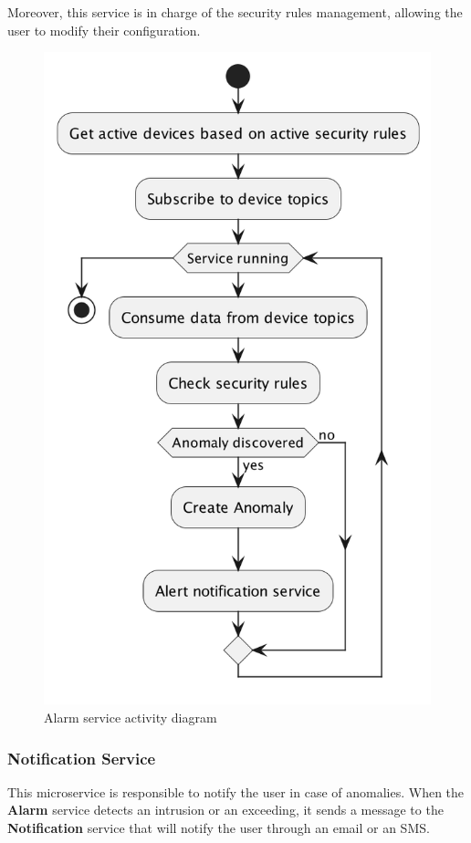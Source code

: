 \documentclass{scrartcl}
\begin{document}
    Moreover, this service is in charge of the security rules management, allowing the user to modify their configuration.

    \begin{figure}
        \centering
        \includegraphics[scale=0.24]{img/alarm-activity}
        \caption{Alarm service activity diagram}
        \label{fig:alarm-activity}
    \end{figure}

    \subsubsection{Notification Service}
    This microservice is responsible to notify the user in case of anomalies.
    When the \textbf{Alarm} service detects an intrusion or an exceeding, it sends a message to the \textbf{Notification}
    service that will notify the user through an email or an SMS\@.
\end{document}
